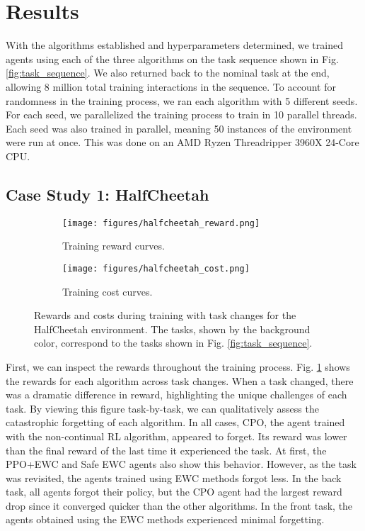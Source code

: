 \section{Results} \label{sec:results}

With the algorithms established and hyperparameters determined, we trained agents using each of the three algorithms on the task sequence shown in Fig. \ref{fig:task_sequence}. We also returned back to the nominal task at the end, allowing 8 million total training interactions in the sequence. To account for randomness in the training process, we ran each algorithm with 5 different seeds. For each seed, we parallelized the training process to train in 10 parallel threads. Each seed was also trained in parallel, meaning 50 instances of the environment were run at once. This was done on an AMD Ryzen Threadripper 3960X 24-Core CPU.

\subsection{Case Study 1: HalfCheetah}

\begin{figure}[t]
    \centering
    \begin{subfigure}[b]{\columnwidth}
        \centering
        \texttt{[image: figures/halfcheetah\_reward.png]} %
        \caption{Training reward curves.}
        \label{fig:cheetah_reward}
    \end{subfigure}
    
    
    \begin{subfigure}[b]{\columnwidth}
        \centering
        \texttt{[image: figures/halfcheetah\_cost.png]} %
        \caption{Training cost curves.}
        \label{fig:cheetah_cost}
    \end{subfigure}
    
    \caption{Rewards and costs during training with task changes for the HalfCheetah environment. The tasks, shown by the background color, correspond to the tasks shown in Fig. \ref{fig:task_sequence}.}
    \label{fig:cheetah_train}
\end{figure}

First, we can inspect the rewards throughout the training process. Fig. \ref{fig:cheetah_reward} shows the rewards for each algorithm across task changes. When a task changed, there was a dramatic difference in reward, highlighting the unique challenges of each task. By viewing this figure task-by-task, we can qualitatively assess the catastrophic forgetting of each algorithm. In all cases, CPO, the agent trained with the non-continual RL algorithm, appeared to forget. Its reward was lower than the final reward of the last time it experienced the task. At first, the PPO+EWC and Safe EWC agents also show this behavior. However, as the task was revisited, the agents trained using EWC methods forgot less. In the back task, all agents forgot their policy, but the CPO agent had the largest reward drop since it converged quicker than the other algorithms. In the front task, the agents obtained using the EWC methods experienced minimal forgetting.


